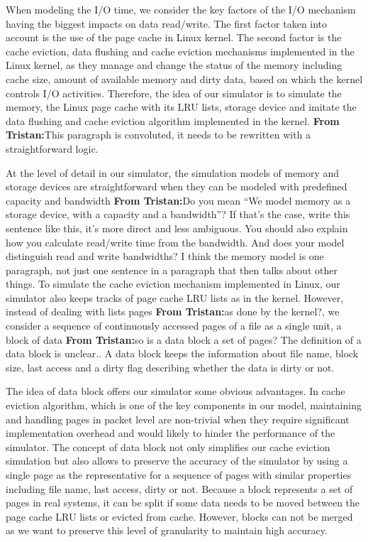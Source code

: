 \documentclass[conference]{IEEEtran}
\newcommand{\tristan}[1]{\color{orange}\textbf{From Tristan:}#1\color{black}}
\begin{document}
			When modeling the I/O time, we consider the key factors of the
			I/O mechanism having the biggest impacts on data read/write.
			The first factor taken into account is the use of the page
			cache in Linux kernel. The second factor  is the cache eviction, 
			data flushing and cache eviction mechanisms implemented in the 
			Linux kernel, as they manage and change the status of the memory 
			including cache size, amount of available memory and 
			dirty data, based on which the kernel controls I/O activities. Therefore, 
			the idea of our simulator is to simulate the memory, the Linux 
			page cache with its LRU lists, storage device and imitate the data flushing 
			and cache eviction algorithm implemented in the kernel. \tristan{This paragraph is convoluted, it needs to be rewritten with a straightforward logic.}
			
			At the level of detail in our simulator, the simulation models of memory 
			and storage devices are straightforward when they can be modeled with 
			predefined capacity and bandwidth \tristan{Do you mean ``We
			model memory as a storage device, with a capacity and a
			bandwidth''? If that's the case, write this sentence like this,
			it's more direct and less ambiguous. You should also explain
			how you calculate read/write time from the bandwidth. And does
			your model distinguish read and write bandwidths? I think the
			memory model is one paragraph, not just one sentence in a
			paragraph that then talks about other things}. To simulate the
			cache eviction mechanism implemented in Linux, our simulator
			also keeps tracks of page cache LRU lists as in the kernel.
			However, instead of dealing with lists pages \tristan{as done by the kernel?}, we 
			consider a sequence of continuously accessed pages of a file as a single 
			unit, a block of data \tristan{so is a data block a set of pages? The definition of a data block is unclear.}. A data block keeps the information about file name, 
			block size, last access and a dirty flag describing whether the data is 
			dirty or not. 
			
			The idea of data block offers our simulator some obvious advantages. 
			In cache eviction algorithm, which is one of the key components 
			in our model, maintaining and handling pages in packet level are 
			non-trivial when they require significant implementation overhead and 
			would likely to hinder the performance of the simulator. The concept of data 
			block not only simplifies our cache eviction simulation but also allows to 
			preserve the accuracy of the simulator by using a single page as the 
			representative for a sequence of pages with similar properties including 
			file name, last access, dirty or not. Because a block represents a set of 
			pages in real systems, it can be split if some data needs to be moved 
			between the page cache LRU lists or evicted from cache. However, blocks can 
			not be merged as we want to preserve this level of granularity to maintain 
			high accuracy.			 
			
\end{document}
